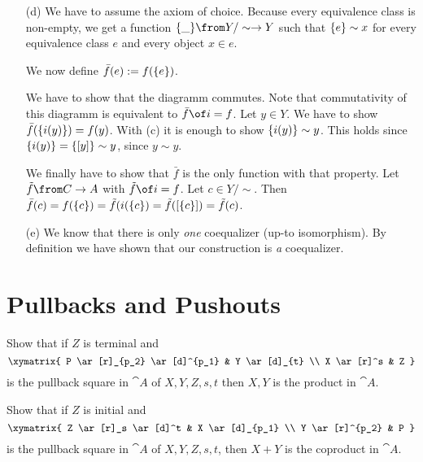 \begin{answer}
\begin{itemize}
    \item[(d)]
      We have to assume the axiom of choice. Because every equivalence class is non-empty, we get a function
      $\choice{ \_ } \from Y/\sim \to Y$ such that $\{  e  \} \sim x$ for every equivalence class $e$ and every object $x \in e$.

      We now define $\bar{f}(e) := f (\{ e \})$.

      We have to show that the diagramm commutes. Note that commutativity of this diagramm is equivalent to $\bar{f} \of i =f$.
      Let $y \in Y$. We have to show $\bar{f}(\{ i (y) \}) = f(y)$. With (c) it is enough to show $\{ i (y) \} \sim y$.
      This holds since $\{ i (y) \} = \{ [ y ] \} \sim y$, since $y \sim y$. \qedhere

      We finally have to show that $\bar{f}$ is the only function with that property.
      Let $\tilde{f} \from C \to A$ with $\tilde{f} \of i = f$. Let $c \in Y /\sim$.
      Then $\bar{f}(c) = f(\{ c \}) = \tilde{f}(i(\{ c \}) = \tilde{f}([ \{ c \} ]) = \tilde{f}(c)$.

    \item[(e)]We know that there is only \emph{one} coequalizer (up-to isomorphism). By definition we have shown that our construction is \emph{a} coequalizer.
  \end{itemize}
\end{answer}

\section{Pullbacks and Pushouts}

\begin{exercise}
  Show that if $Z$ is terminal and
  \[ \xymatrix{
    P \ar[r]_{p_2} \ar[d]^{p_1} & Y \ar[d]_{t} \\
    X \ar[r]^s & Z
  } \]
  is the pullback square in $\cat{A}$ of $X, Y, Z, s, t$ then $X, Y$ is the product in $\cat{A}$.
\end{exercise}

\begin{exercise}
  Show that if $Z$ is initial and
  \[ \xymatrix{
    Z \ar[r]_s \ar[d]^t & X \ar[d]_{p_1} \\
    Y \ar[r]^{p_2} & P
  } \]
  is the pullback square in $\cat{A}$ of $X, Y, Z, s, t$, then $X + Y$ is the coproduct in $\cat{A}$.
\end{exercise}



